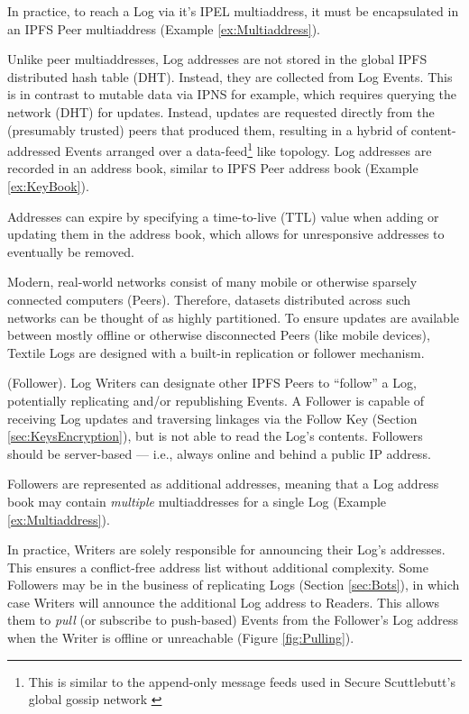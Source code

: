 \documentclass{textile}
\begin{document}
In practice, to reach a Log via it's IPEL multiaddress, it must be encapsulated in an IPFS Peer multiaddress (Example \ref{ex:Multiaddress}).

Unlike peer multiaddresses, Log addresses are not stored in the global IPFS distributed hash table \cite{benetIPFSContentAddressed2014} (DHT). Instead, they are collected from Log Events. This is in contrast to mutable data via IPNS for example, which requires querying the network (DHT) for updates. Instead, updates are requested directly from the (presumably trusted) peers that produced them, resulting in a hybrid of content-addressed Events arranged over a data-feed\footnote{This is similar to the append-only message feeds used in Secure Scuttlebutt’s global gossip network \cite{securescuttlebuttScuttlebuttProtocolGuide}} like topology. Log addresses are recorded in an address book, similar to IPFS Peer address book (Example \ref{ex:KeyBook}).

Addresses can expire by specifying a time-to-live (TTL) value when adding or updating them in the address book, which allows for unresponsive addresses to eventually be removed.

Modern, real-world networks consist of many mobile or otherwise sparsely connected computers (Peers). Therefore, datasets distributed across such networks can be thought of as highly partitioned. To ensure updates are available between mostly offline or otherwise disconnected Peers (like mobile devices), Textile Logs are designed with a built-in replication or follower mechanism.

\begin{definition} (Follower). Log Writers can designate other IPFS Peers to ``follow'' a Log, potentially replicating and/or republishing Events. A Follower is capable of receiving Log updates and traversing linkages via the Follow Key (Section  \ref{sec:KeysEncryption}), but is not able to read the Log's contents. Followers should be server-based --- i.e., always online and behind a public IP address.\end{definition}

Followers are represented as additional addresses, meaning that a Log address book may contain \emph{multiple} multiaddresses for a single Log (Example \ref{ex:Multiaddress}).

In practice, Writers are solely responsible for announcing their Log's addresses. This ensures a conflict-free address list without additional complexity. Some Followers may be in the business of replicating Logs (Section  \ref{sec:Bots}), in which case Writers will announce the additional Log address to Readers. This allows them to \emph{pull} (or subscribe to push-based) Events from the Follower's Log address when the Writer is offline or unreachable (Figure \ref{fig:Pulling}).
\end{document}
